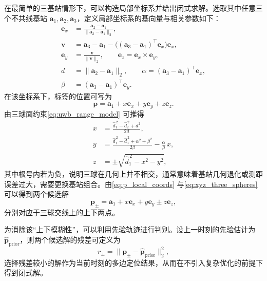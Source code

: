 在最简单的三基站情形下，可以构造局部坐标系并给出闭式求解。选取其中任意三个不共线基站 $\mathbf{a}_1,\mathbf{a}_2,\mathbf{a}_3$，定义局部坐标系的基向量与相关参数如下：
\begin{equation}
    \begin{aligned}
        \mathbf{e}_x &= 
        \frac{\mathbf{a}_2 - \mathbf{a}_1}{\|\mathbf{a}_2 - \mathbf{a}_1\|_2},
        \\
        \mathbf{v} &= \mathbf{a}_3 - \mathbf{a}_1
        - \bigl((\mathbf{a}_3 - \mathbf{a}_1)^\top \mathbf{e}_x\bigr)\mathbf{e}_x,
        \\
        \mathbf{e}_y &= \frac{\mathbf{v}}{\|\mathbf{v}\|_2},\qquad
        \mathbf{e}_z = \mathbf{e}_x \times \mathbf{e}_y,
        \\
        d &= \|\mathbf{a}_2 - \mathbf{a}_1\|_2,\qquad
        \alpha = (\mathbf{a}_3 - \mathbf{a}_1)^\top \mathbf{e}_x,\\
        \beta &= (\mathbf{a}_3 - \mathbf{a}_1)^\top \mathbf{e}_y.
    \end{aligned}
    \label{eq:mlat_basis}
\end{equation}
在该坐标系下，标签的位置可写为
\begin{equation}
    \mathbf{p}
    = \mathbf{a}_1 + x \mathbf{e}_x + y \mathbf{e}_y + z \mathbf{e}_z.
    \label{eq:p_local_coords}
\end{equation}
由三球面约束\eqref{eq:uwb_range_model} 可推得
\begin{equation}
    \begin{aligned}
        x &= \frac{\hat{d}_1^{\,2} - \hat{d}_2^{\,2} + d^2}{2d}, \\
        y &= 
        \frac{\hat{d}_1^{\,2} - \hat{d}_3^{\,2} + \alpha^2 + \beta^2}{2\beta}
        - \frac{\alpha}{\beta}\,x, \\
        z &= \pm \sqrt{\hat{d}_1^{\,2} - x^2 - y^2},
    \end{aligned}
    \label{eq:xyz_three_spheres}
\end{equation}
其中根号内若为负，说明三球在几何上并不相交，通常意味着基站几何退化或测距误差过大，需要更换基站组合。由\eqref{eq:p_local_coords} 与\eqref{eq:xyz_three_spheres} 可以得到两个候选解
\begin{equation}
    \mathbf{p}_\pm
    =
    \mathbf{a}_1 + x \mathbf{e}_x + y \mathbf{e}_y \pm z \mathbf{e}_z,
    \label{eq:two_candidates}
\end{equation}
分别对应于三球交线上的上下两点。

为消除该“上下模糊性”，可以利用先验轨迹进行判别。设上一时刻的先验估计为
$\hat{\mathbf{p}}_{\mathrm{prior}}$，则两个候选解的残差可定义为
\begin{equation}
    r_\pm
    =
    \bigl\|\mathbf{p}_\pm - \hat{\mathbf{p}}_{\mathrm{prior}}\bigr\|_2^2,
    \label{eq:ambiguity_residual}
\end{equation}
选择残差较小的解作为当前时刻的多边定位结果，从而在不引入复杂优化的前提下得到闭式解。

